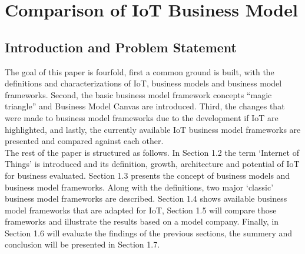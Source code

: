 
\chapter{Comparison of IoT Business Model}


\newpage

\minitoc %

\newpage

\renewcommand{\labelitemii}{$\diamond$}
\renewcommand{\labelitemiii}{$\circ$}

\section{Introduction and Problem Statement}
	The goal of this paper is fourfold, first a common ground is built, with the definitions and characterizations of IoT, business models and business model frameworks. Second, the basic business model framework concepts ``magic triangle'' and  Business Model Canvas are introduced. Third, the changes that were made to business model frameworks due to the development if IoT are highlighted, and lastly, the currently available IoT business model frameworks are presented and compared against each other.\\
	The rest of the paper is structured as follows. In Section 1.2 the term `Internet of Things' is introduced and its definition, growth, architecture and potential of IoT for business evaluated. Section 1.3 presents the concept of business models and business model frameworks. Along with the definitions, two major `classic' business model frameworks are described. Section 1.4 shows available business model frameworks that are adapted for IoT, Section 1.5 will compare those frameworks and illustrate the results based on a model company. Finally, in Section 1.6 will evaluate the findings of the previous sections, the summery and conclusion will be presented in Section 1.7. 
 
